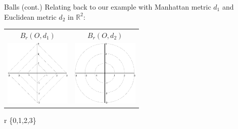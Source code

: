 \documentclass{beamer}
\begin{document}
    \begin{frame}{Balls (cont.)}
        Relating back to our example with Manhattan metric $d_1$ and Euclidean metric $d_2$ in $\mathbb{R}^2$:
        \begin{block}{}
            \centering
            \begin{tabular}{c c}
                $B_r(O,d_1)$ & $B_r(O,d_2)$ \\
                \includegraphics[height=120]{balls2.pdf} & \includegraphics[height=120]{balls1.pdf}\\
            \end{tabular}
            \forall r \in \{0,1,2,3\}
        \end{block}
    \end{frame}
\end{document}
